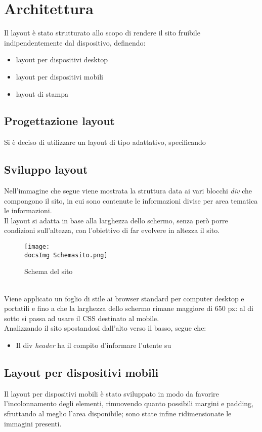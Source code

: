 \section{Architettura}{
	Il layout è stato strutturato allo scopo di rendere il sito fruibile indipendentemente dal dispositivo, definendo:
	\begin{itemize}\itemsep1pt
		\item layout per dispositivi desktop
		\item layout per dispositivi mobili
		\item layout di stampa
	\end{itemize} 
	
	\subsection{Progettazione layout}{
		Si è deciso di utilizzare un layout di tipo adattativo, specificando 
	}
	\subsection{Sviluppo layout}{
		Nell'immagine che segue viene mostrata la struttura data ai vari blocchi \textit{div} che compongono il sito, in cui sono contenute le informazioni divise per area tematica le informazioni.
	\\
	Il layout si adatta in base alla larghezza dello schermo, senza però porre condizioni sull'altezza, con l'obiettivo di far evolvere in altezza il sito.
		\begin{figure}[H]
			\texttt{[image: \\docsImg Schemasito.png]}
			\caption{Schema del sito}
			\label{Schema del sito}
		\end{figure}
		\\
		Viene applicato un foglio di stile ai browser standard per computer desktop e portatili e fino a che la larghezza dello schermo rimane maggiore di 650 px: al di sotto si passa ad usare il CSS destinato al mobile.
		\\
		Analizzando il sito spostandosi dall'alto verso il basso, segue che:
		\begin{itemize}
			\item Il div \textit{header} ha il compito d'informare l'utente su
		\end{itemize}
		}
	\subsection{Layout per dispositivi mobili}{
		Il layout per dispositivi mobili è stato sviluppato in modo da favorire l'incolonnamento degli elementi, rimuovendo quanto possibili margini e padding, sfruttando al meglio l'area disponibile; sono state infine ridimensionate le immagini presenti.
	}
}
